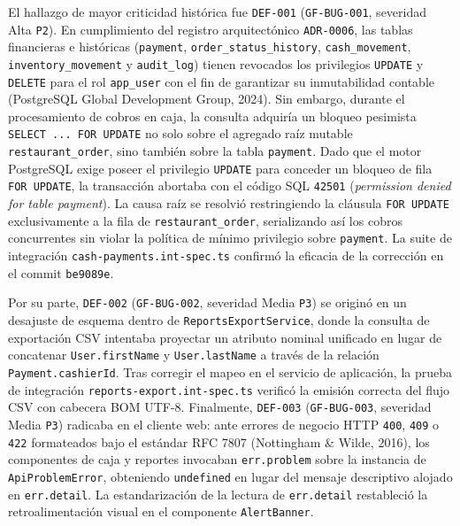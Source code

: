 \documentclass[stu,12pt,a4paper]{apa7}
\begin{document}
El hallazgo de mayor criticidad histórica fue \texttt{DEF-{}\allowbreak{}001} (\texttt{GF-{}\allowbreak{}BUG-{}\allowbreak{}001}, severidad Alta \texttt{P2}). En cumplimiento del registro arquitectónico \texttt{ADR-{}\allowbreak{}0006}, las tablas financieras e históricas (\texttt{payment}, \texttt{order\_\allowbreak{}status\_\allowbreak{}history}, \texttt{cash\_\allowbreak{}movement}, \texttt{inventory\_\allowbreak{}movement} y \texttt{audit\_\allowbreak{}log}) tienen revocados los privilegios \texttt{UPDATE} y \texttt{DELETE} para el rol \texttt{app\_\allowbreak{}user} con el fin de garantizar su inmutabilidad contable (PostgreSQL Global Development Group, 2024). Sin embargo, durante el procesamiento de cobros en caja, la consulta adquiría un bloqueo pesimista \texttt{SELECT .\allowbreak{}.\allowbreak{}.\allowbreak{} FOR UPDATE} no solo sobre el agregado raíz mutable \texttt{restaurant\_\allowbreak{}order}, sino también sobre la tabla \texttt{payment}. Dado que el motor PostgreSQL exige poseer el privilegio \texttt{UPDATE} para conceder un bloqueo de fila \texttt{FOR UPDATE}, la transacción abortaba con el código SQL \texttt{42501} (\emph{permission denied for table payment}). La causa raíz se resolvió restringiendo la cláusula \texttt{FOR UPDATE} exclusivamente a la fila de \texttt{restaurant\_\allowbreak{}order}, serializando así los cobros concurrentes sin violar la política de mínimo privilegio sobre \texttt{payment}. La suite de integración \texttt{cash-{}\allowbreak{}payments.\allowbreak{}int-{}\allowbreak{}spec.\allowbreak{}ts} confirmó la eficacia de la corrección en el commit \texttt{be9089e}.

Por su parte, \texttt{DEF-{}\allowbreak{}002} (\texttt{GF-{}\allowbreak{}BUG-{}\allowbreak{}002}, severidad Media \texttt{P3}) se originó en un desajuste de esquema dentro de \texttt{ReportsExportServi\allowbreak{}ce}, donde la consulta de exportación CSV intentaba proyectar un atributo nominal unificado en lugar de concatenar \texttt{User.\allowbreak{}firstName} y \texttt{User.\allowbreak{}lastName} a través de la relación \texttt{Payment.\allowbreak{}cashierId}. Tras corregir el mapeo en el servicio de aplicación, la prueba de integración \texttt{reports-{}\allowbreak{}export.\allowbreak{}int-{}\allowbreak{}spec.\allowbreak{}ts} verificó la emisión correcta del flujo CSV con cabecera BOM UTF-8. Finalmente, \texttt{DEF-{}\allowbreak{}003} (\texttt{GF-{}\allowbreak{}BUG-{}\allowbreak{}003}, severidad Media \texttt{P3}) radicaba en el cliente web: ante errores de negocio HTTP \texttt{400}, \texttt{409} o \texttt{422} formateados bajo el estándar RFC 7807 (Nottingham \& Wilde, 2016), los componentes de caja y reportes invocaban \texttt{err.\allowbreak{}problem} sobre la instancia de \texttt{ApiProblemError}, obteniendo \texttt{undefined} en lugar del mensaje descriptivo alojado en \texttt{err.\allowbreak{}detail}. La estandarización de la lectura de \texttt{err.\allowbreak{}detail} restableció la retroalimentación visual en el componente \texttt{AlertBanner}.
\end{document}
